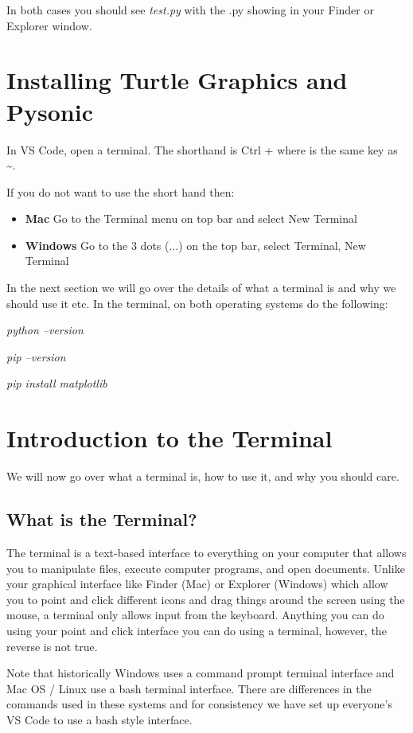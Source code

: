 \documentclass[12pt]{article}
\begin{document}
In both cases you should see \textit{test.py} with the .py showing in your Finder or Explorer window. 

\section{Installing Turtle Graphics and Pysonic}
In VS Code, open a terminal. The shorthand is Ctrl + \textasciigrave where  \textasciigrave is the same key as \textasciitilde{}.

If you do not want to use the short hand then: 
\begin{itemize}
\item \textbf{Mac} Go to the Terminal menu on top bar and select New Terminal
\item \textbf{Windows} Go to the 3 dots (...) on the top bar, select Terminal, New Terminal
\end{itemize}
In the next section we will go over the details of what a terminal is and why we should use it etc. 
In the terminal, on both operating systems do the following:

\vspace{5mm}

\textit{ python --version}

\textit{pip --version}

\textit{pip install matplotlib}

\vspace{5mm}

\section{Introduction to the Terminal}
We will now go over what a terminal is, how to use it, and why you should care. 

\subsection{What is the Terminal?}
The terminal is a text-based interface to everything on your computer that allows you to manipulate files, execute computer programs, and open documents.
Unlike your graphical interface like Finder (Mac) or Explorer (Windows) which allow you to point and click different icons and drag things around the screen using the mouse, a terminal only allows input from the keyboard.
Anything you can do using your point and click interface you can do using a terminal, however, the reverse is not true.

Note that historically Windows uses a command prompt terminal interface and Mac OS / Linux use a bash terminal interface.
There are differences in the commands used in these systems and for consistency we have set up everyone's VS Code to use a bash style interface. 
\end{document}
